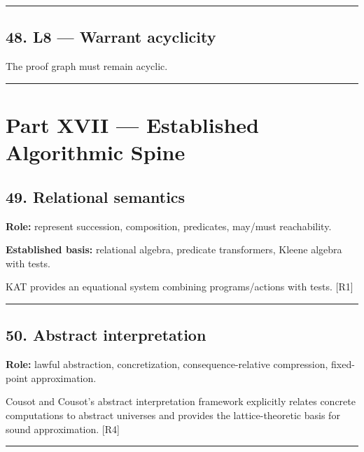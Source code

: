 \documentclass[
]{article}
\begin{document}
\begin{center}\rule{0.5\linewidth}{0.5pt}\end{center}

\subsection{48. L8 --- Warrant acyclicity}\label{l8-warrant-acyclicity}

The proof graph must remain acyclic.

\begin{center}\rule{0.5\linewidth}{0.5pt}\end{center}

\section{Part XVII --- Established Algorithmic
Spine}\label{part-xvii-established-algorithmic-spine}

\subsection{49. Relational semantics}\label{relational-semantics}

\textbf{Role:} represent succession, composition, predicates, may/must
reachability.

\textbf{Established basis:} relational algebra, predicate transformers,
Kleene algebra with tests.

KAT provides an equational system combining programs/actions with tests.
{[}R1{]}

\begin{center}\rule{0.5\linewidth}{0.5pt}\end{center}

\subsection{50. Abstract interpretation}\label{abstract-interpretation}

\textbf{Role:} lawful abstraction, concretization, consequence-relative
compression, fixed-point approximation.

Cousot and Cousot's abstract interpretation framework explicitly relates
concrete computations to abstract universes and provides the
lattice-theoretic basis for sound approximation. {[}R4{]}

\begin{center}\rule{0.5\linewidth}{0.5pt}\end{center}
\end{document}
